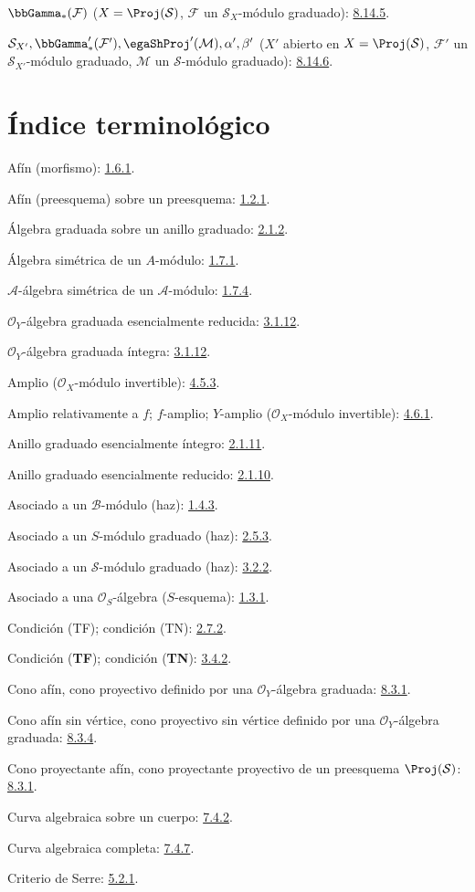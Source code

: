 \documentclass[oneside,10pt]{amsart}
\newcommand{\oldpage}[2][]{\marginnote{\normalfont\footnotesize\textbf{#1}~|~#2}\ignorespaces}
\begin{document}
$\bbGamma_*(\mathcal{F})$
($X=\Proj(\mathcal{S})$, $\mathcal{F}$ un $\mathcal{S}_X$-módulo graduado): \hyperref[II.8.14.5-fr]{8.14.5}.

$\mathcal{S}_{X'},\bbGamma'_*(\mathcal{F}'),\egaShProj'(\mathcal{M}),
\alpha',\beta'$
($X'$ abierto en $X=\Proj(\mathcal{S})$, $\mathcal{F}'$ un $\mathcal{S}_{X'}$-módulo graduado,
$\mathcal{M}$ un $\mathcal{S}$-módulo graduado): \hyperref[II.8.14.6-fr]{8.14.6}.

\endgroup

\clearpage
\oldpage[II]{209}
{}
\section*{Índice terminológico}

\begingroup
\small
\setlength{\parindent}{0pt}
\setlength{\parskip}{2pt}
\newcommand{\egaTerm}[2]{#1: #2.\par}

\egaTerm{Afín (morfismo)}{\hyperref[II.1.6.1-fr]{1.6.1}}
\egaTerm{Afín (preesquema) sobre un preesquema}{\hyperref[II.1.2.1-fr]{1.2.1}}
\egaTerm{Álgebra graduada sobre un anillo graduado}{\hyperref[II.2.1.2-fr]{2.1.2}}
\egaTerm{Álgebra simétrica de un $A$-módulo}{\hyperref[II.1.7.1-fr]{1.7.1}}
\egaTerm{$\mathcal{A}$-álgebra simétrica de un $\mathcal{A}$-módulo}{\hyperref[II.1.7.4-fr]{1.7.4}}
\egaTerm{$\mathcal{O}_Y$-álgebra graduada esencialmente reducida}{\hyperref[II.3.1.12-fr]{3.1.12}}
\egaTerm{$\mathcal{O}_Y$-álgebra graduada íntegra}{\hyperref[II.3.1.12-fr]{3.1.12}}
\egaTerm{Amplio ($\mathcal{O}_X$-módulo invertible)}{\hyperref[II.4.5.3-fr]{4.5.3}}
\egaTerm{Amplio relativamente a $f$; $f$-amplio; $Y$-amplio ($\mathcal{O}_X$-módulo invertible)}{\hyperref[II.4.6.1-fr]{4.6.1}}
\egaTerm{Anillo graduado esencialmente íntegro}{\hyperref[II.2.1.11-fr]{2.1.11}}
\egaTerm{Anillo graduado esencialmente reducido}{\hyperref[II.2.1.10-fr]{2.1.10}}
\egaTerm{Asociado a un $\mathcal{B}$-módulo (haz)}{\hyperref[II.1.4.3-fr]{1.4.3}}
\egaTerm{Asociado a un $S$-módulo graduado (haz)}{\hyperref[II.2.5.3-fr]{2.5.3}}
\egaTerm{Asociado a un $\mathcal{S}$-módulo graduado (haz)}{\hyperref[II.3.2.2-fr]{3.2.2}}
\egaTerm{Asociado a una $\mathcal{O}_S$-álgebra ($S$-esquema)}{\hyperref[II.1.3.1-fr]{1.3.1}}

\egaTerm{Condición (TF); condición (TN)}{\hyperref[II.2.7.2-fr]{2.7.2}}
\egaTerm{Condición (\textbf{TF}); condición (\textbf{TN})}{\hyperref[II.3.4.2-fr]{3.4.2}}
\egaTerm{Cono afín, cono proyectivo definido por una $\mathcal{O}_Y$-álgebra graduada}{\hyperref[II.8.3.1-fr]{8.3.1}}
\egaTerm{Cono afín sin vértice, cono proyectivo sin vértice definido por una $\mathcal{O}_Y$-álgebra graduada}{\hyperref[II.8.3.4-fr]{8.3.4}}
\egaTerm{Cono proyectante afín, cono proyectante proyectivo de un preesquema $\Proj(\mathcal{S})$}{\hyperref[II.8.3.1-fr]{8.3.1}}
\egaTerm{Curva algebraica sobre un cuerpo}{\hyperref[II.7.4.2-fr]{7.4.2}}
\egaTerm{Curva algebraica completa}{\hyperref[II.7.4.7-fr]{7.4.7}}
\egaTerm{Criterio de Serre}{\hyperref[II.5.2.1-fr]{5.2.1}}
\end{document}
